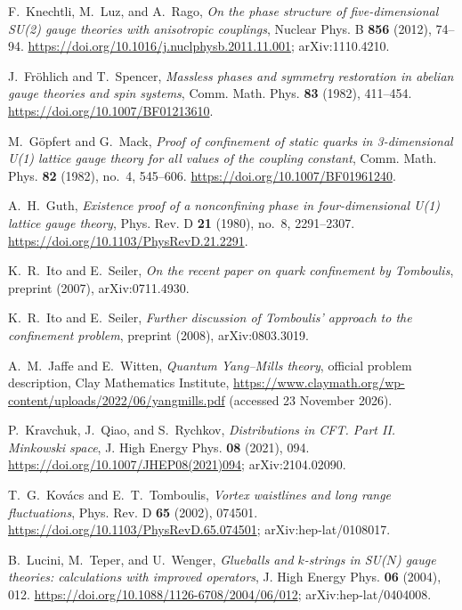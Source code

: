 F.~Knechtli, M.~Luz, and A.~Rago, \emph{On the phase structure of five-dimensional SU(2) gauge theories with anisotropic couplings},
Nuclear Phys. B \textbf{856} (2012), 74--94.
\url{https://doi.org/10.1016/j.nuclphysb.2011.11.001}; arXiv:1110.4210.

J.~Fr\"ohlich and T.~Spencer, \emph{Massless phases and symmetry restoration in abelian gauge theories and spin systems},
Comm. Math. Phys. \textbf{83} (1982), 411--454.
\url{https://doi.org/10.1007/BF01213610}.

M.~G\"opfert and G.~Mack, \emph{Proof of confinement of static quarks in 3-dimensional U(1) lattice gauge theory for all values of the coupling constant},
Comm. Math. Phys. \textbf{82} (1982), no.~4, 545--606.
\url{https://doi.org/10.1007/BF01961240}.

A.~H.~Guth, \emph{Existence proof of a nonconfining phase in four-dimensional U(1) lattice gauge theory},
Phys. Rev. D \textbf{21} (1980), no.~8, 2291--2307.
\url{https://doi.org/10.1103/PhysRevD.21.2291}.

K.~R.~Ito and E.~Seiler, \emph{On the recent paper on quark confinement by Tomboulis},
preprint (2007), arXiv:0711.4930.

K.~R.~Ito and E.~Seiler, \emph{Further discussion of Tomboulis' approach to the confinement problem},
preprint (2008), arXiv:0803.3019.

A.~M.~Jaffe and E.~Witten, \emph{Quantum Yang--Mills theory}, official problem description,
Clay Mathematics Institute, \url{https://www.claymath.org/wp-content/uploads/2022/06/yangmills.pdf}
(accessed 23 November 2026).

P.~Kravchuk, J.~Qiao, and S.~Rychkov, \emph{Distributions in CFT. Part II. Minkowski space},
J. High Energy Phys. \textbf{08} (2021), 094.
\url{https://doi.org/10.1007/JHEP08(2021)094}; arXiv:2104.02090.

T.~G.~Kov\'acs and E.~T.~Tomboulis, \emph{Vortex waistlines and long range fluctuations},
Phys. Rev. D \textbf{65} (2002), 074501.
\url{https://doi.org/10.1103/PhysRevD.65.074501}; arXiv:hep-lat/0108017.

B.~Lucini, M.~Teper, and U.~Wenger, \emph{Glueballs and $k$-strings in SU($N$) gauge theories: calculations with improved operators},
J. High Energy Phys. \textbf{06} (2004), 012.
\url{https://doi.org/10.1088/1126-6708/2004/06/012}; arXiv:hep-lat/0404008.

